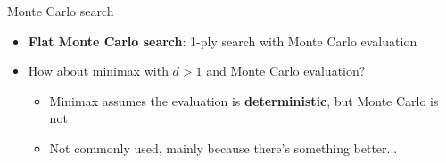 \begin{frame}{Monte Carlo search}
	\begin{itemize}
		\pause\item \textbf{Flat Monte Carlo search}: 1-ply search with Monte Carlo evaluation
		\pause\item How about minimax with $d>1$ and Monte Carlo evaluation?
			\begin{itemize}
				\pause\item Minimax assumes the evaluation is \textbf{deterministic}, but Monte Carlo is not
				\pause\item Not commonly used, mainly because there's something better...
			\end{itemize}
	\end{itemize}
\end{frame}

